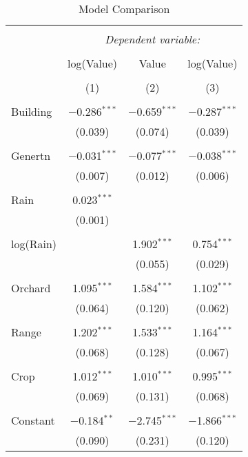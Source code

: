
\begin{table}[!htbp] \centering 
  \caption{Model Comparison} 
  \label{} 
\begin{tabular}{@{\extracolsep{5pt}}lccc} 
\\[-1.8ex]\hline 
\hline \\[-1.8ex] 
 & \multicolumn{3}{c}{\textit{Dependent variable:}} \\ 
\cline{2-4} 
\\[-1.8ex] & log(Value) & Value & log(Value) \\ 
\\[-1.8ex] & (1) & (2) & (3)\\ 
\hline \\[-1.8ex] 
 Building & $-$0.286$^{***}$ & $-$0.659$^{***}$ & $-$0.287$^{***}$ \\ 
  & (0.039) & (0.074) & (0.039) \\ 
  & & & \\ 
 Genertn & $-$0.031$^{***}$ & $-$0.077$^{***}$ & $-$0.038$^{***}$ \\ 
  & (0.007) & (0.012) & (0.006) \\ 
  & & & \\ 
 Rain & 0.023$^{***}$ &  &  \\ 
  & (0.001) &  &  \\ 
  & & & \\ 
 log(Rain) &  & 1.902$^{***}$ & 0.754$^{***}$ \\ 
  &  & (0.055) & (0.029) \\ 
  & & & \\ 
 Orchard & 1.095$^{***}$ & 1.584$^{***}$ & 1.102$^{***}$ \\ 
  & (0.064) & (0.120) & (0.062) \\ 
  & & & \\ 
 Range & 1.202$^{***}$ & 1.533$^{***}$ & 1.164$^{***}$ \\ 
  & (0.068) & (0.128) & (0.067) \\ 
  & & & \\ 
 Crop & 1.012$^{***}$ & 1.010$^{***}$ & 0.995$^{***}$ \\ 
  & (0.069) & (0.131) & (0.068) \\ 
  & & & \\ 
 Constant & $-$0.184$^{**}$ & $-$2.745$^{***}$ & $-$1.866$^{***}$ \\ 
  & (0.090) & (0.231) & (0.120) \\ 

\end{tabular}
\end{table}
